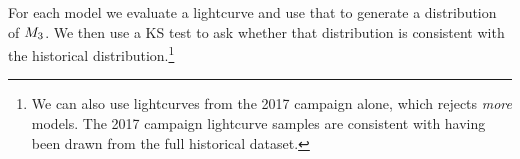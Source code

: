 
For each model we evaluate a lightcurve and use that to generate a distribution of $M_{3}$.  We then use a KS test to ask whether that distribution is consistent with the historical distribution.\footnote{We can also use lightcurves from the 2017 campaign alone, which rejects {\em more} models.  The 2017 campaign lightcurve samples are consistent with having been drawn from the full historical dataset.}

